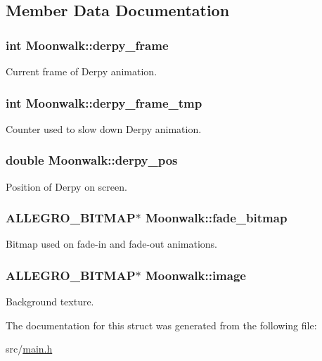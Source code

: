 \subsection{Member Data Documentation}
\hypertarget{structMoonwalk_a4a3874c58e11745d4896b004861e1555}{
\subsubsection[{derpy\-\_\-frame}]{\setlength{\rightskip}{0pt plus 5cm}int Moonwalk\-::derpy\-\_\-frame}}\label{structMoonwalk_a4a3874c58e11745d4896b004861e1555}
Current frame of Derpy animation. \hypertarget{structMoonwalk_ab087ba01cd2a107286ec8f75f58c676c}{
\subsubsection[{derpy\-\_\-frame\-\_\-tmp}]{\setlength{\rightskip}{0pt plus 5cm}int Moonwalk\-::derpy\-\_\-frame\-\_\-tmp}}\label{structMoonwalk_ab087ba01cd2a107286ec8f75f58c676c}
Counter used to slow down Derpy animation. \hypertarget{structMoonwalk_a69689c77a64928bfb52c1dc1e1f7b33f}{
\subsubsection[{derpy\-\_\-pos}]{\setlength{\rightskip}{0pt plus 5cm}double Moonwalk\-::derpy\-\_\-pos}}\label{structMoonwalk_a69689c77a64928bfb52c1dc1e1f7b33f}
Position of Derpy on screen. \hypertarget{structMoonwalk_adfea9d8976238abf5d94a797df7ee929}{
\subsubsection[{fade\-\_\-bitmap}]{\setlength{\rightskip}{0pt plus 5cm}A\-L\-L\-E\-G\-R\-O\-\_\-\-B\-I\-T\-M\-A\-P$\ast$ Moonwalk\-::fade\-\_\-bitmap}}\label{structMoonwalk_adfea9d8976238abf5d94a797df7ee929}
Bitmap used on fade-\/in and fade-\/out animations. \hypertarget{structMoonwalk_a99f8ce8d3a4a8c3faca18b7c36eccdca}{
\subsubsection[{image}]{\setlength{\rightskip}{0pt plus 5cm}A\-L\-L\-E\-G\-R\-O\-\_\-\-B\-I\-T\-M\-A\-P$\ast$ Moonwalk\-::image}}\label{structMoonwalk_a99f8ce8d3a4a8c3faca18b7c36eccdca}
Background texture. 

The documentation for this struct was generated from the following file\-:\begin{DoxyCompactItemize}
\item 
src/\hyperlink{main_8h}{main.\-h}\end{DoxyCompactItemize}
